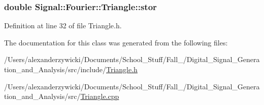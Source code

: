 \hypertarget{classSignal_1_1Fourier_1_1Triangle_ac83be9f42f0e0f497cca36b26cbd5c02}{
\subsubsection[{stor}]{\setlength{\rightskip}{0pt plus 5cm}double Signal\+::\+Fourier\+::\+Triangle\+::stor\hspace{0.3cm}{\ttfamily [protected]}}}\label{classSignal_1_1Fourier_1_1Triangle_ac83be9f42f0e0f497cca36b26cbd5c02}


Definition at line 32 of file Triangle.\+h.



The documentation for this class was generated from the following files\+:\begin{DoxyCompactItemize}
\item 
/\+Users/alexanderzywicki/\+Documents/\+School\+\_\+\+Stuff/\+Fall\+\_/\+Digital\+\_\+\+Signal\+\_\+\+Generation\+\_\+and\+\_\+\+Analysis/src/include/\hyperlink{Triangle_8h}{Triangle.\+h}\item 
/\+Users/alexanderzywicki/\+Documents/\+School\+\_\+\+Stuff/\+Fall\+\_/\+Digital\+\_\+\+Signal\+\_\+\+Generation\+\_\+and\+\_\+\+Analysis/src/\hyperlink{Triangle_8cpp}{Triangle.\+cpp}\end{DoxyCompactItemize}
